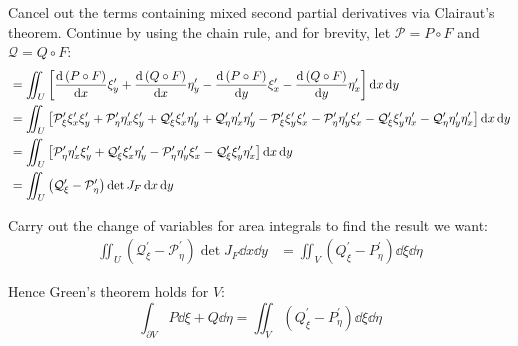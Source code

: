 \documentclass[11pt]{article}
\newcommand{\br}[1]{\left(#1\right)}
\newcommand{\sbr}[1]{\left[#1\right]}
\begin{document}
Cancel out the terms containing mixed second partial derivatives via Clairaut's theorem. Continue by using the chain rule, and for brevity, let $\mathcal{P} = P\circ F$ and $\mathcal{Q} = Q\circ F$:
\begin{align*}
    &= \iint_U\sbr{\dv{\br{P\circ F}}{x}\xi^{\prime}_y + \dv{\br{Q\circ F}}{x}\eta^{\prime}_y - \dv{\br{P\circ F}}{y}\xi^{\prime}_x - \dv{\br{Q\circ F}}{y}\eta^{\prime}_x }\dd{x}\dd{y} \\
    &= \iint_U \sbr{\mathcal{P}^{\prime}_{\xi}\xi^{\prime}_{x}\xi^{\prime}_{y} + \mathcal{P}^{\prime}_{\eta}\eta^{\prime}_{x}\xi^{\prime}_{y} + \mathcal{Q}^{\prime}_{\xi}\xi^{\prime}_{x}\eta^{\prime}_{y} + \mathcal{Q}^{\prime}_{\eta}\eta^{\prime}_{x}\eta^{\prime}_{y} - \mathcal{P}^{\prime}_{\xi}\xi^{\prime}_{y}\xi^{\prime}_{x} - \mathcal{P}^{\prime}_{\eta}\eta^{\prime}_{y}\xi^{\prime}_{x} - \mathcal{Q}^{\prime}_{\xi}\xi^{\prime}_{y}\eta^{\prime}_{x} - \mathcal{Q}^{\prime}_{\eta}\eta^{\prime}_{y}\eta^{\prime}_{x}}\dd{x}\dd{y} \\
    &= \iint_U \sbr{\mathcal{P}^{\prime}_{\eta}\eta^{\prime}_{x}\xi^{\prime}_{y} + \mathcal{Q}^{\prime}_{\xi}\xi^{\prime}_{x}\eta^{\prime}_{y} - \mathcal{P}^{\prime}_{\eta}\eta^{\prime}_{y}\xi^{\prime}_{x} - \mathcal{Q}^{\prime}_{\xi}\xi^{\prime}_{y}\eta^{\prime}_{x}}\dd{x}\dd{y} \\
    &= \iint_U \br{\mathcal{Q}^{\prime}_{\xi} - \mathcal{P}^{\prime}_{\eta}}\det J_F\dd{x}\dd{y} \\
\end{align*}

Carry out the change of variables for area integrals to find the result we want:
\begin{align*}
    \iint_U \br{\mathcal{Q}^{\prime}_{\xi} - \mathcal{P}^{\prime}_{\eta}}\det J_F\dd{x}\dd{y} &= \iint_V \br{Q^{\prime}_{\xi} - P^{\prime}_{\eta}}\dd{\xi}\dd{\eta}
\end{align*}

Hence Green's theorem holds for $V$:
$$\int_{\partial V} P\dd{\xi} + Q\dd{\eta} = \iint_V \br{Q^{\prime}_{\xi} - P^{\prime}_{\eta}}\dd{\xi}\dd{\eta}$$
\end{document}
